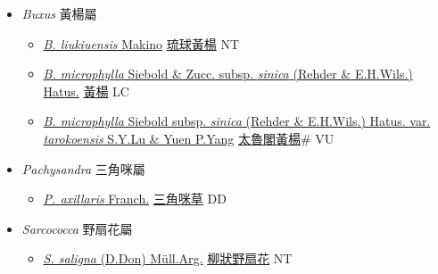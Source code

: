 
  \begin{itemize}
 \item[] \textit{Buxus} 黃楊屬
                    
  \begin{itemize}
        \item[] \href{http://www.theplantlist.org/tpl1.1/search?q=Buxus+liukiuensis}{\textit{B. liukiuensis} Makino}   \href{\detokenize{http://taibnet.sinica.edu.tw/chi/taibnet_species_list.php?T2=琉球黃楊&T2_new_value=true&fr=y}}{琉球黃楊} NT
        \item[] \href{http://www.theplantlist.org/tpl1.1/search?q=Buxus+microphylla+subsp.+sinica}{\textit{B. microphylla} Siebold \& Zucc. subsp. \textit{sinica} (Rehder \& E.H.Wils.) Hatus.}   \href{\detokenize{http://taibnet.sinica.edu.tw/chi/taibnet_species_list.php?T2=黃楊&T2_new_value=true&fr=y}}{黃楊} LC
        \item[] \href{http://www.theplantlist.org/tpl1.1/search?q=Buxus+microphylla+subsp.+sinica+var.+tarokoensis}{\textit{B. microphylla} Siebold subsp. \textit{sinica} (Rehder \& E.H.Wils.) Hatus. var. \textit{tarokoensis} S.Y.Lu \& Yuen P.Yang}   \href{\detokenize{http://taibnet.sinica.edu.tw/chi/taibnet_species_list.php?T2=太魯閣黃楊&T2_new_value=true&fr=y}}{太魯閣黃楊}\# VU
  \end{itemize}
 \item[] \textit{Pachysandra} 三角咪屬
                    
  \begin{itemize}
        \item[] \href{http://www.theplantlist.org/tpl1.1/search?q=Pachysandra+axillaris}{\textit{P. axillaris} Franch.}   \href{\detokenize{http://taibnet.sinica.edu.tw/chi/taibnet_species_list.php?T2=三角咪草&T2_new_value=true&fr=y}}{三角咪草} DD
  \end{itemize}
 \item[] \textit{Sarcococca} 野扇花屬
                    
  \begin{itemize}
        \item[] \href{http://www.theplantlist.org/tpl1.1/search?q=Sarcococca+saligna}{\textit{S. saligna} (D.Don) Müll.Arg.}   \href{\detokenize{http://taibnet.sinica.edu.tw/chi/taibnet_species_list.php?T2=柳狀野扇花&T2_new_value=true&fr=y}}{柳狀野扇花} NT
  \end{itemize}
  \end{itemize}
